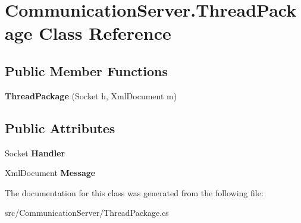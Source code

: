 \hypertarget{class_communication_server_1_1_thread_package}{}\section{Communication\+Server.\+Thread\+Package Class Reference}
\label{class_communication_server_1_1_thread_package}
\subsection*{Public Member Functions}
\begin{DoxyCompactItemize}
\item 
\hypertarget{class_communication_server_1_1_thread_package_ae68ad842ce89d51084c298d0aed6b288}{}{\bfseries Thread\+Package} (Socket h, Xml\+Document m)\label{class_communication_server_1_1_thread_package_ae68ad842ce89d51084c298d0aed6b288}

\end{DoxyCompactItemize}
\subsection*{Public Attributes}
\begin{DoxyCompactItemize}
\item 
\hypertarget{class_communication_server_1_1_thread_package_a1b387a120f124b1c941a059c60b42c3e}{}Socket {\bfseries Handler}\label{class_communication_server_1_1_thread_package_a1b387a120f124b1c941a059c60b42c3e}

\item 
\hypertarget{class_communication_server_1_1_thread_package_a3c91800d1765e7148985a6513bda863e}{}Xml\+Document {\bfseries Message}\label{class_communication_server_1_1_thread_package_a3c91800d1765e7148985a6513bda863e}

\end{DoxyCompactItemize}


The documentation for this class was generated from the following file\+:\begin{DoxyCompactItemize}
\item 
src/\+Communication\+Server/Thread\+Package.\+cs\end{DoxyCompactItemize}
